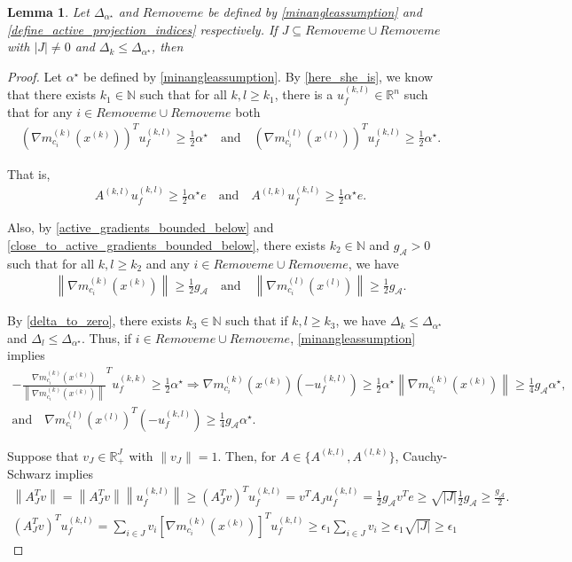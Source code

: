 \documentclass{article}
\newtheorem{lemma}[theorem]{Lemma}
\theoremstyle{case}
\numberwithin{theorem}{subsection}
\newcommand{\dk}{\Delta_k}
\newcommand{\dl}{\Delta_l}
\newcommand{\gmcik}{{\nabla m_{c_i}^{(k)}\left(\xk\right)}}
\newcommand{\gmcil}{{\nabla m_{c_i}^{(l)}\left(\xl\right)}}
\newcommand{\minactivegrad}{{ g_{\mathcal A} }}
\newcommand{\minanglealpha}{{ \alpha^{\star} }}
\newcommand{\minangledelta}{{\Delta_{\alpha^{\star}}}}
\newcommand{\naturals}{\mathbb N}
\newcommand{\Rn}{\mathbb R^n}
\newcommand{\xk}{x^{(k)}}
\newcommand{\xl}{{x^{(l)}}}
\newcommand{\activeprojk}{{Remove me}}
\newcommand{\activeprojl}{{Remove me}}
\begin{document}
\begin{lemma}
Let $\minangledelta$ and $\activeprojk$ be defined by \cref{minangleassumption} and \cref{define_active_projection_indices} respectively.
If $J \subseteq \activeprojl \cup \activeprojk$ with $|J| \ne 0$
and $\dk \le \minangledelta$,
then
\end{lemma}
\begin{proof}
Let $\minanglealpha$ be defined by \cref{minangleassumption}.
By \cref{here_she_is}, we know that there exists $k_1\in\naturals$ such that for all $k, l \ge k_1$, there is a 
$u^{(k, l)}_f \in \Rn$ such that for any $i \in \activeprojk \cup \activeprojl$
both 
\begin{align*}
\left(\gmcik\right)^T u_f^{(k,l)} \ge \frac 1 2 \minanglealpha
\quad \textrm{and} \quad
\left(\gmcil\right)^T u_f^{(k,l)} \ge \frac 1 2 \minanglealpha.
\end{align*}

That is,
\begin{align*}
A^{(k, l)} u_f^{(k,l)} \ge \frac 1 2 \minanglealpha e
\quad \textrm{and} \quad
A^{(l, k)} u_f^{(k,l)} \ge \frac 1 2 \minanglealpha e.
\end{align*}

\color{red}
Also, by \cref{active_gradients_bounded_below} and \cref{close_to_active_gradients_bounded_below},
there exists $k_2\in\naturals$ and $\minactivegrad>0$ such that for all $k, l \ge k_2$ and any $i \in \activeprojk \cup \activeprojl$, we have
\begin{align*}
\left\|\gmcik\right\| \ge \frac 1 2 \minactivegrad
\quad \textrm{and} \quad
\left\|\gmcil\right\| \ge \frac 1 2 \minactivegrad.
\end{align*}


By \cref{delta_to_zero}, there exists $k_3 \in \naturals$ such that if $k, l \ge k_3$, we have
$\dk \le \minangledelta$ and $\dl \le \minangledelta$.
Thus, if $i \in \activeprojk \cup \activeprojl$, \cref{minangleassumption} implies
\begin{align*}
-\frac {\gmcik}{\left\|\gmcik\right\|} ^T u_f^{(k, k)} \ge \frac 1 2 \minanglealpha
\Longrightarrow 
\gmcik\left(-u_f^{(k, l)}\right)\ge \frac 1 2 \minanglealpha \left\|\gmcik\right\| \ge \frac 1 4 \minactivegrad\minanglealpha, \\
\textrm{and} \quad \gmcil^T \left(-u_f^{(k, l)}\right) \ge \frac 1 4 \minactivegrad\minanglealpha.
\end{align*}
\color{black}

Suppose that $v_J \in \mathbb R^J_+$ with $\|v_J\| = 1$.
Then, for $A \in \{A^{(k, l)}, A^{(l, k)}\}$, Cauchy-Schwarz implies
 \begin{align*}
 \left\|A_J^Tv\right\| = \left\|A_J^Tv\right\| \left\|u_f^{(k,l)}\right\| \ge
\left(A_J^Tv\right)^Tu_f^{(k,l)}
= v^TA_J u_f^{(k,l)}
= \frac 1 2 \minactivegrad v^Te
\ge \sqrt{|J|} \frac 1 2 \minactivegrad
\ge \frac {\minactivegrad} 2 .
\end{align*}
\color{red}
\begin{align*}
\left(A_J^Tv\right)^Tu_f^{(k,l)}
= \sum_{i \in J} v_i \left[\gmcik\right]^Tu_f^{(k,l)}
\ge \epsilon_1 \sum_{i \in J} v_i \ge \epsilon_1 \sqrt{|J|} \ge \epsilon_1
\end{align*}
\color{black}


\end{proof}
\end{document}
